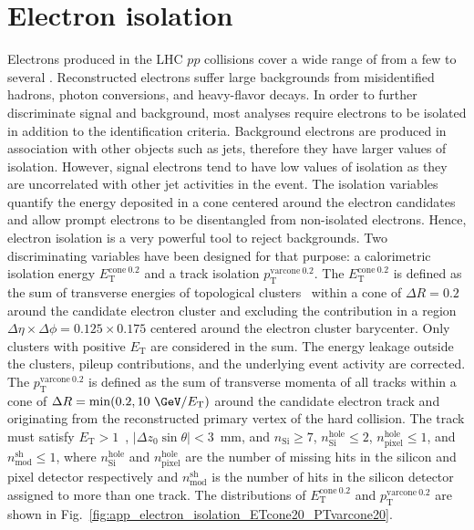 \section{Electron isolation}
\label{sec:app_electron_isolation}
Electrons produced in the LHC $pp$ collisions cover a wide range of \met from a few {\GeV} to several {\TeV}.
Reconstructed electrons suffer large backgrounds from misidentified hadrons, photon conversions, and heavy-flavor decays.
In order to further discriminate signal and background, most analyses require electrons to be isolated in addition to the identification criteria.
Background electrons are produced in association with other objects such as jets, therefore they have larger values of isolation. 
However, signal electrons tend to have low values of isolation as they are uncorrelated with other jet activities in the event.
The isolation variables quantify the energy deposited in a cone centered around the electron candidates and allow prompt electrons to be disentangled from non-isolated electrons.
Hence, electron isolation is a very powerful tool to reject backgrounds.
Two discriminating variables have been designed for that purpose: a calorimetric isolation energy $E_\mathrm{T}^\mathrm{cone\ 0.2}$ and a track isolation $p_\mathrm{T}^\mathrm{varcone\ 0.2}$.
The $E_\mathrm{T}^\mathrm{cone\ 0.2}$ is defined as the sum of transverse energies of topological clusters~\cite{Aad:2016upy} within a cone of $\Delta R = 0.2$ around the candidate electron cluster and excluding the contribution in a region $\Delta \eta \times \Delta \phi = 0.125 \times 0.175$ centered around the electron cluster barycenter.
Only clusters with positive $E_\mathrm{T}$ are considered in the sum.
The energy leakage outside the clusters, pileup contributions, and the underlying event activity are corrected. 
The $p_\mathrm{T}^\mathrm{varcone\ 0.2}$ is defined as the sum of transverse momenta of all tracks within a cone of $\Delta R = \mathrm{min}(0.2, 10~{\GeV}/E_\mathrm{T})$ around the candidate electron track and originating from the reconstructed primary vertex of the hard collision.
The track must satisfy $E_\mathrm{T} > 1$~{\GeV}, $|\Delta z_{0} \sin \theta| < 3$~mm, and $n_\mathrm{Si} \ge 7$, $n_\mathrm{Si}^\mathrm{hole} \le 2$, $n_\mathrm{pixel}^\mathrm{hole} \le 1$, and $n_\mathrm{mod}^\mathrm{sh} \le 1$, where $n_\mathrm{Si}^\mathrm{hole}$ and $n_\mathrm{pixel}^\mathrm{hole}$ are the number of missing hits in the silicon and pixel detector respectively and $n_\mathrm{mod}^\mathrm{sh}$ is the number of hits in the silicon detector assigned to more than one track.
The distributions of $E_\mathrm{T}^\mathrm{cone\ 0.2}$ and $p_\mathrm{T}^\mathrm{varcone\ 0.2}$ are shown in Fig.~\ref{fig:app_electron_isolation_ETcone20_PTvarcone20}.

